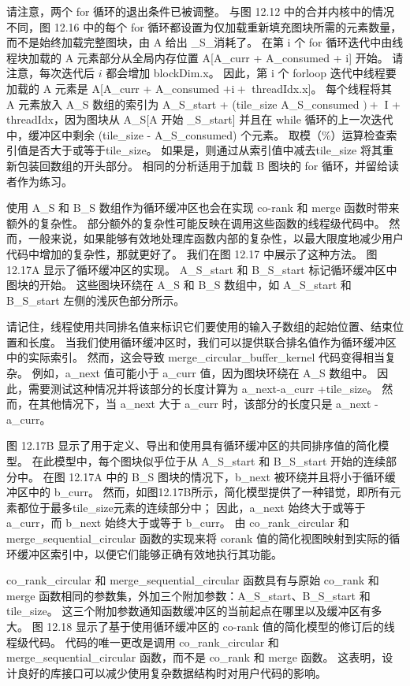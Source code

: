 请注意，两个 for 循环的退出条件已被调整。 与图 12.12 中的合并内核中的情况不同，图 12.16 中的每个 for 循环都设置为仅加载重新填充图块所需的元素数量，而不是始终加载完整图块，由 A 给出 \_S\_消耗了。 在第 i 个 for 循环迭代中由线程块加载的 A 元素部分从全局内存位置 A[A\_curr + A\_consumed + i] 开始。 请注意，每次迭代后 $i$ 都会增加 blockDim.x。 因此，第 i 个 forloop 迭代中线程要加载的 A 元素是 A[A\_curr + A\_consumed $+\mathrm{i}+$ threadIdx.x]。 每个线程将其 A 元素放入 A\_S 数组的索引为 A\_S\_start + (tile\_size A\_S\_consumed $)+$ I + threadIdx，因为图块从 A\_S[A 开始 \_S\_start] 并且在 while 循环的上一次迭代中，缓冲区中剩余 (tile\_size - A\_S\_consumed) 个元素。 取模（\%）运算检查索引值是否大于或等于tile\_size。 如果是，则通过从索引值中减去tile\_size 将其重新包装回数组的开头部分。 相同的分析适用于加载 B 图块的 for 循环，并留给读者作为练习。

使用 A\_S 和 B\_S 数组作为循环缓冲区也会在实现 co-rank 和 merge 函数时带来额外的复杂性。 部分额外的复杂性可能反映在调用这些函数的线程级代码中。 然而，一般来说，如果能够有效地处理库函数内部的复杂性，以最大限度地减少用户代码中增加的复杂性，那就更好了。 我们在图 12.17 中展示了这种方法。 图 12.17A 显示了循环缓冲区的实现。 A\_S\_start 和 B\_S\_start 标记循环缓冲区中图块的开始。 这些图块环绕在 A\_S 和 B\_S 数组中，如 A\_S\_start 和 B\_S\_start 左侧的浅灰色部分所示。

请记住，线程使用共同排名值来标识它们要使用的输入子数组的起始位置、结束位置和长度。 当我们使用循环缓冲区时，我们可以提供联合排名值作为循环缓冲区中的实际索引。 然而，这会导致 merge\_circular\_buffer\_kernel 代码变得相当复杂。 例如，a\_next 值可能小于 a\_curr 值，因为图块环绕在 A\_S 数组中。 因此，需要测试这种情况并将该部分的长度计算为 a\_next-a\_curr +tile\_size。 然而，在其他情况下，当 a\_next 大于 a\_curr 时，该部分的长度只是 a\_next - a\_curr。

图 12.17B 显示了用于定义、导出和使用具有循环缓冲区的共同排序值的简化模型。 在此模型中，每个图块似乎位于从 A\_S\_start 和 B\_S\_start 开始的连续部分中。 在图 12.17A 中的 B\_S 图块的情况下，b\_next 被环绕并且将小于循环缓冲区中的 b\_curr。 然而，如图12.17B所示，简化模型提供了一种错觉，即所有元素都位于最多tile\_size元素的连续部分中； 因此，a\_next 始终大于或等于 a\_curr，而 b\_next 始终大于或等于 b\_curr。 由 co\_rank\_circular 和 merge\_sequential\_circular 函数的实现来将 corank 值的简化视图映射到实际的循环缓冲区索引中，以便它们能够正确有效地执行其功能。

co\_rank\_circular 和 merge\_sequential\_circular 函数具有与原始 co\_rank 和 merge 函数相同的参数集，外加三个附加参数：A\_S\_start、B\_S\_start 和tile\_size。 这三个附加参数通知函数缓冲区的当前起点在哪里以及缓冲区有多大。 图 12.18 显示了基于使用循环缓冲区的 co-rank 值的简化模型的修订后的线程级代码。 代码的唯一更改是调用 co\_rank\_circular 和 merge\_sequential\_circular 函数，而不是 co\_rank 和 merge 函数。 这表明，设计良好的库接口可以减少使用复杂数据结构时对用户代码的影响。

